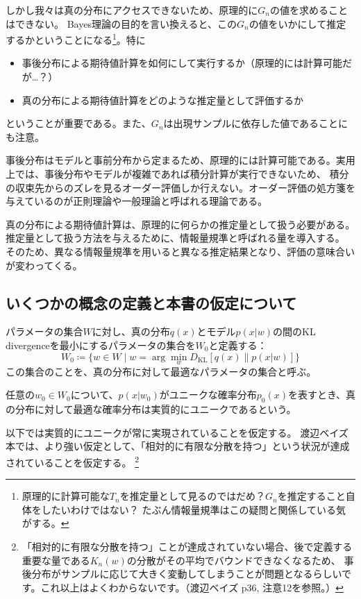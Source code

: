 \documentclass[dvipdfmx]{jsarticle}
\begin{document}
\begin{mybox}[Bayes理論の目的]
\begin{equation}
        \label{eq:bayes-goal}
    \end{equation}
    しかし我々は真の分布にアクセスできないため、原理的に$G_n$の値を求めることはできない。
    Bayes理論の目的を言い換えると、この$G_n$の値をいかにして推定するかということになる\footnote{
        原理的に計算可能な$T_n$を推定量として見るのではだめ？$G_n$を推定すること自体をしたいわけではない？
        たぶん情報量規準はこの疑問と関係している気がする。
    }。特に
    \begin{itemize}
        \item 事後分布による期待値計算を如何にして実行するか（原理的には計算可能だが…？）
        \item 真の分布による期待値計算をどのような推定量として評価するか
    \end{itemize}
    ということが重要である。また、$G_n$は出現サンプルに依存した値であることにも注意。
\end{mybox}
\newpage
事後分布はモデルと事前分布から定まるため、原理的には計算可能である。実用上では、事後分布やモデルが複雑であれば積分計算が実行できないため、
積分の収束先からのズレを見るオーダー評価しか行えない。オーダー評価の処方箋を与えているのが正則理論や一般理論と呼ばれる理論である。

{\color{red}{（情報量規準についてまだ理解してないので、この段落は自分の予想）}}真の分布による期待値計算は、原理的に何らかの推定量として扱う必要がある。
推定量として扱う方法を与えるために、情報量規準と呼ばれる量を導入する。
そのため、異なる情報量規準を用いると異なる推定結果となり、評価の意味合いが変わってくる。

\subsection{いくつかの概念の定義と本書の仮定について}

\begin{mybox}[真の分布に対して最適なパラメータの集合]
    パラメータの集合$W$に対し、真の分布$q(x)$とモデル$p(x|w)$の間のKL divergenceを最小にするパラメータの集合を$W_0$と定義する：
    \begin{equation}
        W_0 \coloneqq \{ w \in W \mid w = \arg\min_{w} D_{\mathrm{KL}}[q(x) \parallel p(x|w)] \}
        \label{eq:optimal-parameter-set}
    \end{equation}
    この集合のことを、真の分布に対して最適なパラメータの集合と呼ぶ。
\end{mybox}

\begin{mybox}[実質的にユニーク]
    任意の$w_0\in W_0$について、$p(x|w_0)$がユニークな確率分布$p_0(x)$を表すとき、真の分布に対して最適な確率分布は実質的にユニークであるという。
\end{mybox}
以下では実質的にユニークが常に実現されていることを仮定する。
渡辺ベイズ本では、より強い仮定として、「相対的に有限な分散を持つ」という状況が達成されていることを仮定する。
\footnote{「相対的に有限な分散を持つ」ことが達成されていない場合、後で定義する重要な量である$K_n(w)$の分散がその平均でバウンドできなくなるため、
事後分布がサンプルに応じて大きく変動してしまうことが問題となるらしいです。これ以上はよくわからないです。（渡辺ベイズ p36, 注意12を参照。）}
\end{document}
